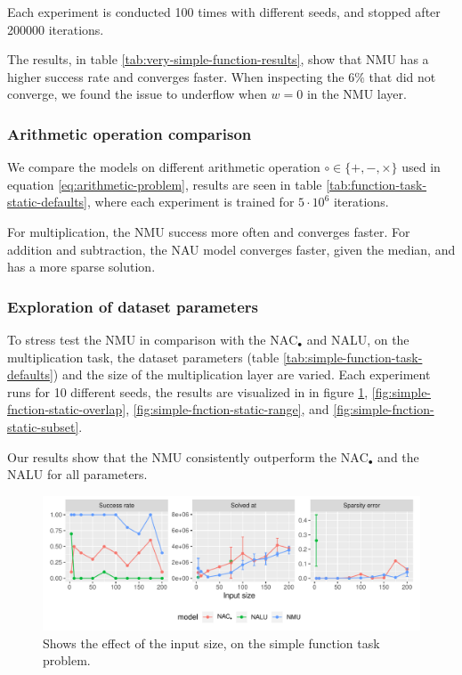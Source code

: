 Each experiment is conducted 100 times with different seeds, and stopped after 200000 iterations.

The results, in table \ref{tab:very-simple-function-results}, show that NMU has a higher success rate and converges faster. When inspecting the $6\%$ that did not converge, we found the issue to underflow when $w = 0$ in the NMU layer.



\subsubsection{Arithmetic operation comparison}
We compare the models on different arithmetic operation $\circ \in \{+, -, \times\}$ used in equation \ref{eq:arithmetic-problem}, results are seen in table \ref{tab:function-task-static-defaults}, where each experiment is trained for $5 \cdot 10^6$ iterations.

For multiplication, the NMU success more often and converges faster. For addition and subtraction, the NAU model converges faster, given the median, and has a more sparse solution.



\subsubsection{Exploration of dataset parameters}
To stress test the NMU in comparison with the  $\mathrm{NAC}_{\bullet}$ and NALU, on the multiplication task, the dataset parameters (table \ref{tab:simple-function-task-defaults}) and the size of the multiplication layer are varied. Each experiment runs for 10 different seeds, the results are visualized in in figure \ref{fig:simple-fnction-static-input-size}, \ref{fig:simple-fnction-static-overlap}, \ref{fig:simple-fnction-static-range}, and \ref{fig:simple-fnction-static-subset}. 

Our results show that the NMU consistently outperform the $\mathrm{NAC}_{\bullet}$ and the NALU for all parameters.

\begin{figure}[H]
\centering
\includegraphics[width=\linewidth]{results/simple_function_static_input_size.pdf}
\caption{Shows the effect of the input size, on the simple function task problem.}
\label{fig:simple-fnction-static-input-size}
\end{figure}

